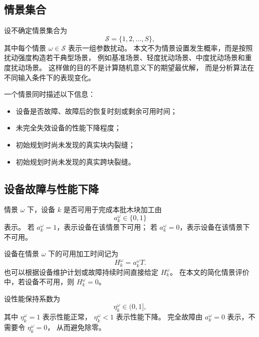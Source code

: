 ﻿\documentclass[UTF8,12pt,a4paper]{ctexart}
\begin{document}
\subsection{情景集合}

\begin{description}[leftmargin=2em,labelsep=0.5em,itemsep=0.6em]
  \item[\textbf{情景集合：}]
设不确定情景集合为
\[
\mathcal S=\{1,2,\ldots,S\},
\]
其中每个情景 \(\omega\in\mathcal S\) 表示一组参数扰动。
本文不为情景设置发生概率，而是按照扰动强度构造若干典型场景，
例如基准场景、轻度扰动场景、中度扰动场景和重度扰动场景。
这样做的目的不是计算随机意义下的期望最优解，
而是分析算法在不同输入条件下的表现变化。

  \item[\textbf{情景包含的信息：}]
一个情景同时描述以下信息：
\begin{itemize}
  \item 设备是否故障、故障后的恢复时刻或剩余可用时间；
  \item 未完全失效设备的性能下降程度；
  \item 初始规划时尚未发现的真实块内裂缝；
  \item 初始规划时尚未发现的真实跨块裂缝。
\end{itemize}
\end{description}

\subsection{设备故障与性能下降}

\begin{description}[leftmargin=2em,labelsep=0.5em,itemsep=0.6em]
  \item[\textbf{设备可用标志：}]
情景 \(\omega\) 下，设备 \(k\) 是否可用于完成本批木块加工由
\[
a_k^\omega\in\{0,1\}
\]
表示。
若 \(a_k^\omega=1\)，表示设备在该情景下可用；
若 \(a_k^\omega=0\)，表示设备在该情景下不可用。

  \item[\textbf{剩余可用时间：}]
设备在情景 \(\omega\) 下的可用加工时间记为
\[
H_k^\omega
=
a_k^\omega T.
\]
也可以根据设备维护计划或故障持续时间直接给定 \(H_k^\omega\)。
在本文的简化情景评价中，若设备不可用，则 \(H_k^\omega=0\)。

  \item[\textbf{性能保持系数：}]
设性能保持系数为
\[
\eta_k^\omega\in(0,1],
\]
其中 \(\eta_k^\omega=1\) 表示性能正常，
\(\eta_k^\omega<1\) 表示性能下降。
完全故障由 \(a_k^\omega=0\) 表示，不需要令 \(\eta_k^\omega=0\)，
从而避免除零。
\end{description}
\end{document}
